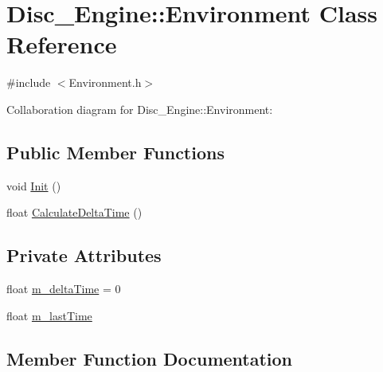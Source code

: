 \hypertarget{class_disc___engine_1_1_environment}{}\section{Disc\+\_\+\+Engine\+:\+:Environment Class Reference}
\label{class_disc___engine_1_1_environment}


{\ttfamily \#include $<$Environment.\+h$>$}



Collaboration diagram for Disc\+\_\+\+Engine\+:\+:Environment\+:
\subsection*{Public Member Functions}
\begin{DoxyCompactItemize}
\item 
void \mbox{\hyperlink{class_disc___engine_1_1_environment_ac1be0e72a698abd0faf74181cf987b6a}{Init}} ()
\item 
float \mbox{\hyperlink{class_disc___engine_1_1_environment_a47ead3cbe21efbbc1c54330ef994ab6a}{Calculate\+Delta\+Time}} ()
\end{DoxyCompactItemize}
\subsection*{Private Attributes}
\begin{DoxyCompactItemize}
\item 
float \mbox{\hyperlink{class_disc___engine_1_1_environment_ab4e378b7b2322558d97be3995ac07215}{m\+\_\+delta\+Time}} = 0
\item 
float \mbox{\hyperlink{class_disc___engine_1_1_environment_a2b8b8ce2785c71d9fa946a6a0e3c8d7b}{m\+\_\+last\+Time}}
\end{DoxyCompactItemize}


\subsection{Member Function Documentation}
\mbox{\label{class_disc___engine_1_1_environment_a47ead3cbe21efbbc1c54330ef994ab6a}} 

